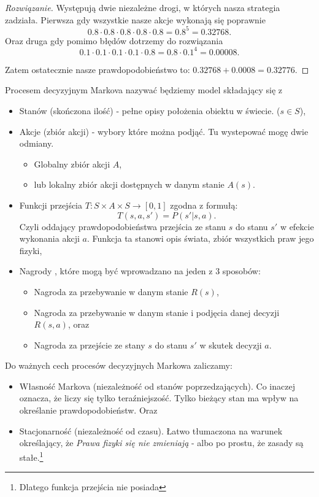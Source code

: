 \documentclass[10pt,a4paper]{book}
\begin{document}
\begin{proof}[Rozwiązanie]
Występują dwie niezależne drogi, w których nasza strategia zadziała. Pierwsza gdy wszystkie nasze akcje wykonają się poprawnie
$$
0.8 \cdot 0.8 \cdot 0.8 \cdot 0.8 \cdot 0.8 = 0.8 ^5 = 0.32768.
$$
Oraz druga gdy pomimo błędów dotrzemy do rozwiązania
$$
0.1 \cdot 0.1 \cdot 0.1 \cdot 0.1 \cdot 0.8 = 0.8 \cdot 0.1^4 = 0.00008. 
$$

Zatem ostatecznie nasze prawdopodobieństwo to: $0.32768 + 0.0008 = 0.32776$. 
\end{proof}


\begin{definition}
Procesem decyzyjnym Markova nazywać będziemy model składający się z 
\begin{itemize}
\item Stanów (skończona ilość) - pełne opisy położenia obiektu w świecie. ($s \in S$),
\item  Akcje (zbiór akcji) - wybory które można podjąć. Tu wystepować mogę dwie odmiany.
\begin{itemize}
\item Globalny zbiór akcji $A$,
\item lub lokalny zbiór akcji dostępnych w danym stanie $A(s)$.
\end{itemize}
\item Funkcji przejścia $T \colon S \times A \times S \to [0,1]$ zgodna z formułą:
$$
T(s, a, s') = P( s' | s, a ).
$$
Czyli oddający prawdopodobieństwa przejścia ze stanu $s$ do stanu $s'$ w efekcie wykonania akcji $a$. Funkcja ta stanowi opis świata, zbiór wszystkich praw jego fizyki,
\item  Nagrody , które mogą być wprowadzano na jeden z 3 sposobów:
\begin{itemize}
\item Nagroda za przebywanie w danym stanie $R(s)$,
\item Nagroda za przebywanie w danym stanie i podjęcia danej decyzji $R(s,a)$, oraz
\item Nagroda za przejście ze stany $s$ do stanu $s'$ w skutek decyzji $a$.
\end{itemize}
\end{itemize}
Do ważnych cech procesów decyzyjnych Markowa zaliczamy:
\begin{itemize}
\item Własność Markova (niezależność od stanów poprzedzających). Co inaczej oznacza, że liczy się tylko teraźniejszość. Tylko bieżący stan ma wpływ na określanie prawdopodobieństw. Oraz
\item Stacjonarność (niezależność od czasu). Łatwo tłumaczona na warunek określający, że \textit{Prawa fizyki się nie zmieniają} - albo po prostu, że zasady są stałe.\footnote{Dlatego funkcja przejścia nie posiada }
\end{itemize}
\end{definition}
\end{document}
